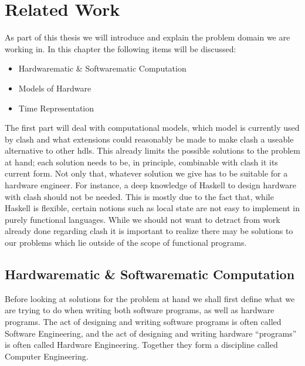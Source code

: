 
\chapter{Related Work}
As part of this thesis we will introduce and explain the problem domain we are working in. 
In this chapter the following items will be discussed:
\begin{itemize}
 \item Hardwarematic \& Softwarematic Computation
 \item Models of Hardware
 \item Time Representation 
\end{itemize}

The first part will deal with computational models, which model is currently used by \gls{clash} and what extensions could reasonably be made to make \gls{clash} a useable alternative to other \gls{hdl}s. 
This already limits the possible solutions to the problem at hand; each solution needs to be, in principle, combinable with \gls{clash} it its current form.
Not only that, whatever solution we give has to be suitable for a hardware engineer. 
For instance, a deep knowledge of Haskell to design hardware with \gls{clash} should not be needed.
This is mostly due to the fact that, while Haskell is flexible, certain notions such as local state are not easy to implement in purely functional languages.
While we should not want to detract from work already done regarding \gls{clash} it is important to realize there may be solutions to our problems which lie outside of the scope of functional programs.

\section{Hardwarematic \& Softwarematic Computation}
Before looking at solutions for the problem at hand we shall first define what we are trying to do when writing both software programs, as well as hardware programs.
The act of designing and writing software programs is often called Software Engineering, and the act of designing and writing hardware ``programs'' is often called Hardware Engineering. 
Together they form a discipline called Computer Engineering.

